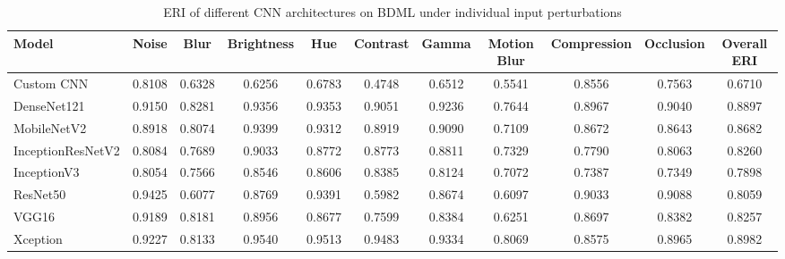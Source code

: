 \documentclass[a4paper,fleqn]{cas-dc}
\begin{document}
\begin{table}[t]
\centering
\caption{ERI of different CNN architectures on BDML under individual input perturbations}
\label{tab:eri_perturbation_bdmedileaves}

\scriptsize
\setlength{\tabcolsep}{4pt}
\renewcommand{\arraystretch}{1.1}

\begin{tabular}{|l|ccccccccc|c|}
\hline
\textbf{Model} &
\textbf{Noise} &
\textbf{Blur} &
\textbf{Brightness} &
\textbf{Hue} &
\textbf{Contrast} &
\textbf{Gamma} &
\textbf{Motion Blur} &
\textbf{Compression} &
\textbf{Occlusion} &
\textbf{Overall ERI} \\
\hline

Custom CNN
&0.8108&0.6328&0.6256&0.6783&0.4748&0.6512&0.5541&0.8556&0.7563&0.6710\\

DenseNet121
&0.9150&0.8281&0.9356&0.9353&0.9051&0.9236&0.7644&0.8967&0.9040&0.8897\\

MobileNetV2
&0.8918&0.8074&0.9399&0.9312&0.8919&0.9090&0.7109&0.8672&0.8643&0.8682\\

InceptionResNetV2
&0.8084&0.7689&0.9033&0.8772&0.8773&0.8811&0.7329&0.7790&0.8063&0.8260\\

InceptionV3
&0.8054&0.7566&0.8546&0.8606&0.8385&0.8124&0.7072&0.7387&0.7349&0.7898\\

ResNet50
&0.9425&0.6077&0.8769&0.9391&0.5982&0.8674&0.6097&0.9033&0.9088&0.8059\\

VGG16
&0.9189&0.8181&0.8956&0.8677&0.7599&0.8384&0.6251&0.8697&0.8382&0.8257\\

Xception
&0.9227&0.8133&0.9540&0.9513&0.9483&0.9334&0.8069&0.8575&0.8965&0.8982\\

\hline
\end{tabular}
\end{table}
\end{document}
